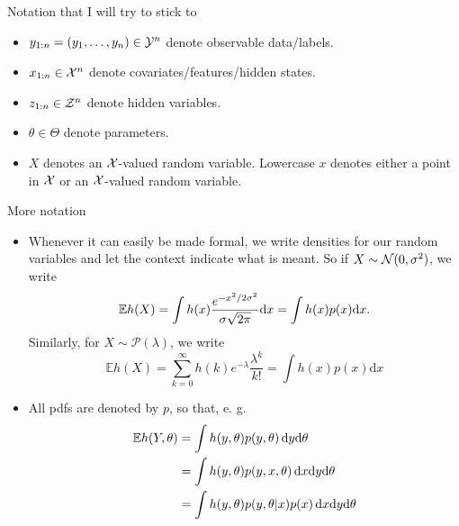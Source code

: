 \documentclass[10pt]{beamer}
\begin{document}
\begin{frame}{Notation that I will try to stick to}
\begin{itemize}
  \vfill\item $y_{1:n} = (y_1,\dots,y_n) \in \mathcal{Y}^n$ denote observable data/labels.
  \vfill\item $x_{1:n} \in \mathcal{X}^n$ denote covariates/features/hidden states.
  \vfill\item $z_{1:n} \in \mathcal{Z}^n$ denote hidden variables.
  \vfill\item $\theta\in\Theta$ denote parameters.
  \vfill\item $X$ denotes an $\mathcal{X}$-valued random variable. Lowercase $x$ denotes either a point in $\mathcal{X}$ or an $\mathcal{X}$-valued random variable.
\end{itemize}
\end{frame}

\begin{frame}{More notation}
  \begin{itemize}
  \vfill\item Whenever it can easily be made formal,
  we write densities for our random variables and let the context indicate what is meant. So if $X\sim \mathcal{N}(0,\sigma^2)$, we write
  $$ \mathbb E h(X) = \int h(x) \frac{e^{-x^2/2\sigma^2}}{\sigma\sqrt{2\pi}}{\rm d} x = \int h(x)p(x)\mathrm{d}x.$$
  Similarly, for $X\sim \mathcal P(\lambda)$, we write
  $$ \mathbb E h(X) = \sum_{k=0}^\infty h(k) e^{-\lambda}\frac{\lambda^k}{k!} = \int h(x) p(x)\mathrm{d} x$$
  \vfill\item All pdfs are denoted by $p$, so that, e. g.
  \begin{align*}
\mathbb{E} h(Y, \theta) &= \int h(y, \theta)p(y, \theta)\,{\rm d} y{\rm d} \theta\\
&= \int h(y, \theta)p(y, x, \theta) \,{\rm d} x{\rm d} y {\rm d}\theta\\
&= \int h(y, \theta) p(y, \theta\vert x)p(x) \,{\rm d} x{\rm d} y {\rm d}\theta
  \end{align*}
\end{itemize}
\end{frame}

   
\end{document}
